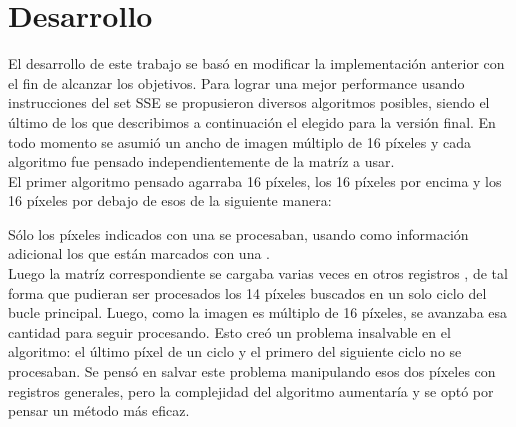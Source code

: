 \section{Desarrollo}

El desarrollo de este trabajo se bas\'o en modificar la implementaci\'on anterior con el fin de alcanzar los objetivos. Para lograr una mejor performance usando instrucciones del set SSE se propusieron diversos algoritmos posibles, siendo el \'ultimo de los que describimos a continuaci\'on el elegido para la versi\'on final. En todo momento se asumi\'o un ancho de imagen m\'ultiplo de 16 p\'ixeles y cada algoritmo fue pensado independientemente de la matr\'iz a usar.\\

El primer algoritmo pensado agarraba 16 p\'ixeles, los 16 p\'ixeles por encima y los 16 p\'ixeles por debajo de esos de la siguiente manera: \\


\vspace{0.5cm}

S\'olo los p\'ixeles indicados con una  se procesaban, usando como informaci\'on adicional los que est\'an marcados con una . \\

Luego la matr\'iz correspondiente se cargaba varias veces en otros registros , de tal forma que pudieran ser procesados los 14 p\'ixeles buscados en un solo ciclo del bucle principal. Luego, como la imagen es m\'ultiplo de 16 p\'ixeles, se avanzaba esa cantidad para seguir procesando.
Esto cre\'o un problema insalvable en el algoritmo: el \'ultimo p\'ixel de un ciclo y el primero del siguiente ciclo no se procesaban. Se pens\'o en salvar este problema manipulando esos dos p\'ixeles con registros generales, pero la complejidad del algoritmo aumentar\'ia y se opt\'o por pensar un m\'etodo m\'as eficaz. \\


